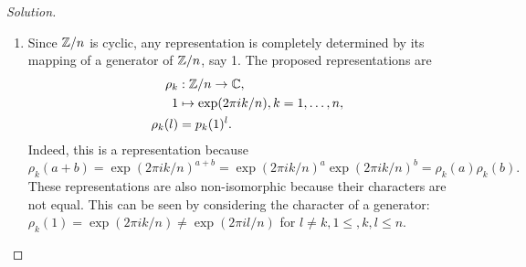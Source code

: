 \begin{proof}[Solution]
\hfill
\begin{enumerate}[font=\normalfont,label=\textbf{(\alph*)}, wide]
\item Since $\mathbb{Z}/n$ is cyclic, any representation is completely determined by its mapping of a generator of $\mathbb{Z}/n$, say 1. The proposed representations are
\[
\begin{aligned}
\rho_k &: \mathbb{Z}/n \to \mathbb{C}, \\
1 &\mapsto \exp(2\pi i k/n), k = 1, \ldots, n, \\
\rho_k(l) &= p_k(1)^l.
\end{aligned}
\]
Indeed, this is a representation because 
\[
\rho_k(a + b) = \exp(2\pi i k/n)^{a+b}= \exp(2\pi i k/n)^{a} \exp(2\pi i k/n)^{b} = \rho_k(a)\rho_k(b). 
\]
These representations are also non-isomorphic because their characters are not equal. This can be seen by considering the character of a generator: $\rho_k(1) = \exp(2\pi i k/n) \neq \exp(2\pi i l/n)$ for $l \neq k, 1 \leq, k, l \leq n$. 


\end{enumerate}
\end{proof}
